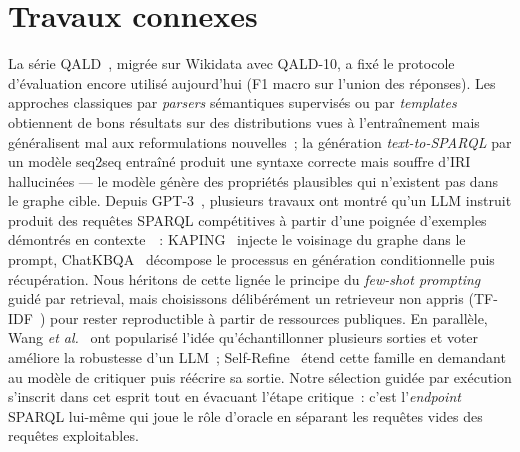\documentclass[]{ceurart}
\begin{document}
\section{Travaux connexes}
\label{sec:related}
La série QALD~\cite{usbeck2017qald}, migrée sur Wikidata avec QALD-10, a fixé le protocole d'évaluation encore utilisé aujourd'hui (F1 macro sur l'union des réponses). Les approches classiques par \emph{parsers} sémantiques supervisés ou par \emph{templates} obtiennent de bons résultats sur des distributions vues à l'entraînement mais généralisent mal aux reformulations nouvelles~; la génération \emph{text-to-SPARQL} par un modèle seq2seq entraîné produit une syntaxe correcte mais souffre d'IRI hallucinées — le modèle génère des propriétés plausibles qui n'existent pas dans le graphe cible. Depuis GPT-3~\cite{brown2020gpt3}, plusieurs travaux ont montré qu'un LLM instruit produit des requêtes SPARQL compétitives à partir d'une poignée d'exemples démontrés en contexte~\cite{li2023fewshot}~: KAPING~\cite{baek2023kaping} injecte le voisinage du graphe dans le prompt, ChatKBQA~\cite{luo2024chatkbqa} décompose le processus en génération conditionnelle puis récupération. Nous héritons de cette lignée le principe du \emph{few-shot prompting} guidé par retrieval, mais choisissons délibérément un retrieveur non appris (TF-IDF~\cite{salton1988term}) pour rester reproductible à partir de ressources publiques. En parallèle, Wang \emph{et al.}~\cite{wang2022selfconsistency} ont popularisé l'idée qu'échantillonner plusieurs sorties et voter améliore la robustesse d'un LLM~; Self-Refine~\cite{madaan2023selfrefine} étend cette famille en demandant au modèle de critiquer puis réécrire sa sortie. Notre sélection guidée par exécution s'inscrit dans cet esprit tout en évacuant l'étape critique~: c'est l'\emph{endpoint} SPARQL lui-même qui joue le rôle d'oracle en séparant les requêtes vides des requêtes exploitables.

\end{document}
